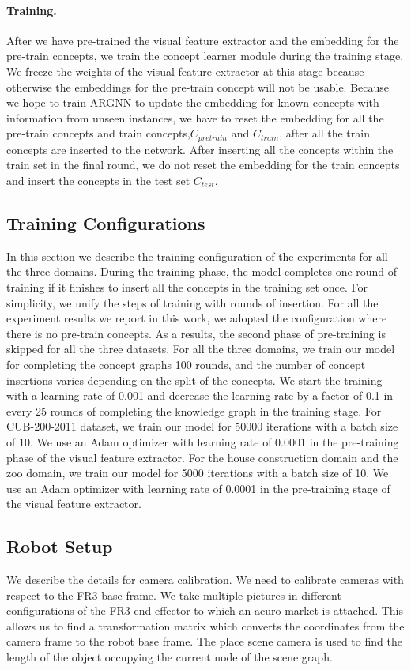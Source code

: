  \paragraph{Training.} 
 After we have pre-trained the visual feature extractor and the embedding for the pre-train concepts,  we train the concept learner module during the training stage.  We freeze the weights of the visual feature extractor at this stage because otherwise the embeddings for the pre-train concept will not be usable.  Because we hope to train ARGNN to update the embedding for known concepts with information from unseen instances, we have to reset the embedding for all the pre-train concepts and train concepts,$C_{pretrain}$ and $C_{train}$, after all the train concepts are inserted to the network.  After inserting all the concepts within the train set in the final round, we do not reset the embedding for the train concepts and insert the concepts in the test set $C_{test}$. 

\subsection{Training Configurations}
In this section we describe the training configuration of the experiments for all the three domains. 
During the training phase, the model completes one round of training if it finishes to insert all the concepts in the training set once. For simplicity, we unify the steps of training with rounds of insertion.
For all the experiment results we report in this work, we adopted the configuration where there is no pre-train concepts.
As a results, the second phase of pre-training is skipped for all the three datasets.
For all the three domains, we train our model for completing the concept graphs 100 rounds, and the number of concept insertions varies depending on the split of the concepts. We start the training with a learning rate of 0.001 and decrease the learning rate by a factor of 0.1 in every 25 rounds of completing the knowledge graph in the training stage.
For CUB-200-2011 dataset, we train our model for 50000 iterations with a batch size of 10. We use an Adam optimizer with learning rate of 0.0001 in the pre-training phase of the visual feature extractor.
For the house construction domain and the zoo domain, we train our model for 5000 iterations with a batch size of 10. We use an Adam optimizer with learning rate of 0.0001 in the pre-training stage of the visual feature extractor.

\subsection{Robot Setup}
We describe the details for camera calibration.
We need to calibrate cameras with respect to the FR3 base frame. 
We take multiple pictures in different configurations of the FR3 end-effector to which an acuro market is attached. This allows us to find a transformation matrix which converts the coordinates from the  camera frame to the robot base frame. The place scene camera is used to find the length of the object occupying the current node of the scene graph. 

